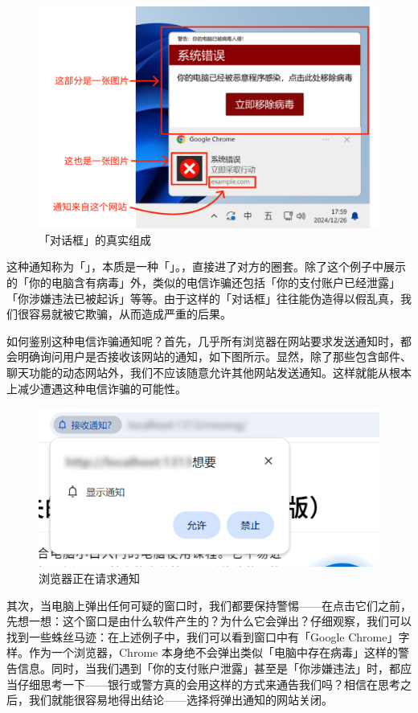 \begin{figure}[htb!]
  \centering
  \includegraphics[width=.7\textwidth]{assets/basic/Fake_notification_components.png}
  \caption{「对话框」的真实组成}
  \label{fig:Fake_notification_components}
\end{figure}

这种通知称为「」，本质是一种「」。，直接进了对方的圈套。除了这个例子中展示的「你的电脑含有病毒」外，类似的电信诈骗还包括「你的支付账户已经泄露」「你涉嫌违法已被起诉」等等。由于这样的「对话框」往往能伪造得以假乱真，我们很容易就被它欺骗，从而造成严重的后果。

如何鉴别这种电信诈骗通知呢？首先，几乎所有浏览器在网站要求发送通知时，都会明确询问用户是否接收该网站的通知，如下图所示。显然，除了那些包含邮件、聊天功能的动态网站外，我们不应该随意允许其他网站发送通知。这样就能从根本上减少遭遇这种电信诈骗的可能性。

\begin{figure}[htb!]
  \centering
  \includegraphics[width=.6\textwidth]{assets/basic/Website_ask_for_notification_permission.png}
  \caption{浏览器正在请求通知}
  \label{fig:Website_ask_for_notification_permission}
\end{figure}

其次，当电脑上弹出任何可疑的窗口时，我们都要保持警惕——在点击它们之前，先想一想：这个窗口是由什么软件产生的？为什么它会弹出？仔细观察，我们可以找到一些蛛丝马迹：在上述例子中，我们可以看到窗口中有「Google Chrome」字样。作为一个浏览器，Chrome 本身绝不会弹出类似「电脑中存在病毒」这样的警告信息。同时，当我们遇到「你的支付账户泄露」甚至是「你涉嫌违法」时，都应当仔细思考一下——银行或警方真的会用这样的方式来通告我们吗？相信在思考之后，我们就能很容易地得出结论——选择将弹出通知的网站关闭。

